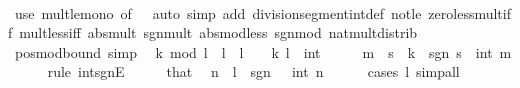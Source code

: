 \begin{isabellebody}
\ \ \isamarkupfalse%
\isanewline
{}\isamarkupfalse%
\ {\isacharparenleft}{\kern0pt}use\ mult{\isacharunderscore}{\kern0pt}le{\isacharunderscore}{\kern0pt}mono{}\ {\isacharbrackleft}{\kern0pt}of\ {}{\isacharbrackright}{\kern0pt}\ \ {\isacartoucheopen}auto\ simp\ add{\isacharcolon}{\kern0pt}\ division{\isacharunderscore}{\kern0pt}segment{\isacharunderscore}{\kern0pt}int{\isacharunderscore}{\kern0pt}def\ not{\isacharunderscore}{\kern0pt}le\ zero{\isacharunderscore}{\kern0pt}less{\isacharunderscore}{\kern0pt}mult{\isacharunderscore}{\kern0pt}iff\ mult{\isacharunderscore}{\kern0pt}less{\isacharunderscore}{\kern0pt}{}{\isacharunderscore}{\kern0pt}iff\ abs{\isacharunderscore}{\kern0pt}mult\ sgn{\isacharunderscore}{\kern0pt}mult\ abs{\isacharunderscore}{\kern0pt}mod{\isacharunderscore}{\kern0pt}less\ sgn{\isacharunderscore}{\kern0pt}mod\ nat{\isacharunderscore}{\kern0pt}mult{\isacharunderscore}{\kern0pt}distrib{\isacartoucheclose}{\isacharparenright}{\kern0pt}%
\endisatagproof
{\isafoldproof}%
%
\isadelimproof
%
\endisadelimproof
\isanewline
\isanewline
{}\isamarkupfalse%
\isanewline
\isanewline
{}\isamarkupfalse%
\ pos{\isacharunderscore}{\kern0pt}mod{\isacharunderscore}{\kern0pt}bound\ {\isacharbrackleft}{\kern0pt}simp{\isacharbrackright}{\kern0pt}{\isacharcolon}{\kern0pt}\isanewline
\ \ {\isachardoublequoteopen}k\ mod\ l\ {\isacharless}{\kern0pt}\ l{\isachardoublequoteclose}\ \ {\isachardoublequoteopen}l\ {\isachargreater}{\kern0pt}\ {}{\isachardoublequoteclose}\ \ k\ l\ {\isacharcolon}{\kern0pt}{\isacharcolon}{\kern0pt}\ int\isanewline
%
\isadelimproof
%
\endisadelimproof
%
\isatagproof
{}\isamarkupfalse%
\ {\isacharminus}{\kern0pt}\isanewline
\ \ \isamarkupfalse%
\ m\ \ s\ \ {\isachardoublequoteopen}k\ {\isacharequal}{\kern0pt}\ sgn\ s\ {\isacharasterisk}{\kern0pt}\ int\ m{\isachardoublequoteclose}\isanewline
\ \ \ \ \isamarkupfalse%
\ {\isacharparenleft}{\kern0pt}rule\ int{\isacharunderscore}{\kern0pt}sgnE{\isacharparenright}{\kern0pt}\isanewline
\ \ \isamarkupfalse%
\ \isamarkupfalse%
\ that\ \isamarkupfalse%
\ n\ \ {\isachardoublequoteopen}l\ {\isacharequal}{\kern0pt}\ sgn\ {}\ {\isacharasterisk}{\kern0pt}\ int\ n{\isachardoublequoteclose}\isanewline
\ \ \ \ \isamarkupfalse%
\ {\isacharparenleft}{\kern0pt}cases\ l{\isacharparenright}{\kern0pt}\ simp{\isacharunderscore}{\kern0pt}all\isanewline

\end{isabellebody}
